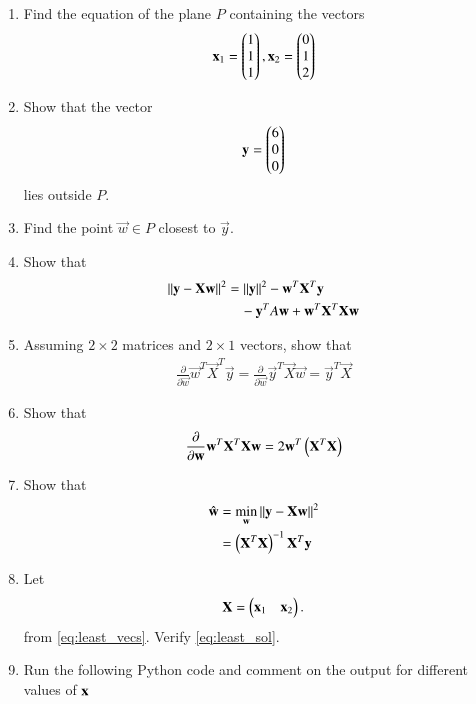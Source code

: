 \renewcommand{\theequation}{\theenumi}
\begin{enumerate}[label=\arabic*.,ref=\thesubsection.\theenumi]
\item Find the equation of the plane $P$
containing the vectors 
%
\begin{align}
\label{eq:least_vecs}
\mathbf{x}_1 = \begin{pmatrix}1 \\ 1 \\ 1\end{pmatrix}
,
\mathbf{x}_2 = \begin{pmatrix}0 \\ 1 \\ 2\end{pmatrix}
\end{align}
%
\item Show that the vector 
\begin{align}
\mathbf{y} = \begin{pmatrix}6 \\ 0 \\ 0\end{pmatrix}
\end{align}
lies outside $P$.
\item Find the point $\vec{w} \in P$ closest to $\vec{y}$.
\item Show that
\begin{align}
\left\lVert\mathbf{y}-\mathbf{X}\mathbf{w}\right\rVert^2 &= \left\lVert\mathbf{y}\right\rVert^2 - \mathbf{w}^T\mathbf{X}^T\mathbf{y} 
\\
& \quad - \mathbf{y}^TA\mathbf{w}+\mathbf{w}^T\mathbf{X}^T\mathbf{X}\mathbf{w}
\end{align}
%
\item Assuming $2\times 2$ matrices and $2 \times 1$ vectors, show that
\begin{align}
\frac{\partial}{\partial\vec{w}}\vec{w}^T\vec{X}^T\vec{y} = \frac{\partial}{\partial\vec{w}}\vec{y}^T\vec{X}\vec{w} = 
\vec{y}^T\vec{X}
\end{align}
\item Show that
\begin{align}
\frac{\partial}{\partial\mathbf{w}}\mathbf{w}^T\mathbf{X}^T\mathbf{X}\mathbf{w} = 2\mathbf{w}^T\left(\mathbf{X}^T\mathbf{X}\right)
\end{align}
\item Show that 
\begin{align}
\hat{\mathbf{w}} &= \min_{\mathbf{w}}\left\lVert\mathbf{y}-\mathbf{X}\mathbf{w}\right\rVert^2
\\
 &= \left(\mathbf{X}^T\mathbf{X}\right)^{-1}\mathbf{X}^T \mathbf{y}
\label{eq:least_sol}
\end{align}
\item Let 
\begin{align}
\mathbf{X} = \begin{pmatrix}\mathbf{x}_1 & \mathbf{x}_2\end{pmatrix}.
\end{align}
from \eqref{eq:least_vecs}.
Verify \eqref{eq:least_sol}.
\item
Run the following Python code and comment on the output for different values of $\mathbf{x}$
\begin{lstlisting}
 

\end{lstlisting}
\end{enumerate}
